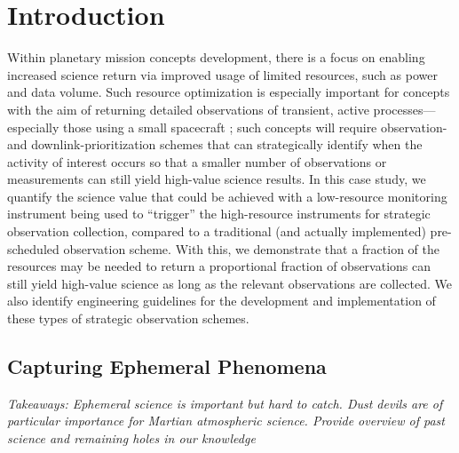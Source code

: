\section{Introduction} 
\label{sec:Introduction}

Within planetary mission concepts development, there is a focus on enabling increased science return via improved usage of limited resources, such as power and data volume.  
Such resource optimization is especially important for concepts with the aim of returning detailed observations of transient, active processes---especially those using a small spacecraft \cite{MCESAG}; such concepts will require observation- and downlink-prioritization schemes that can strategically identify when the activity of interest occurs so that a smaller number of observations or measurements can still yield high-value science results.
In this case study, we quantify the science value that could be achieved with a low-resource monitoring instrument being used to ``trigger'' the high-resource instruments for strategic observation collection, compared to a traditional (and actually implemented) pre-scheduled observation scheme. 
With this, we demonstrate that a fraction of the resources may be needed to return a proportional fraction of observations can still yield high-value science as long as the relevant observations are collected.
We also identify engineering guidelines for the development and implementation of these types of strategic observation schemes.

\subsection{Capturing Ephemeral Phenomena}
\textit{Takeaways: Ephemeral science is important but hard to catch. Dust devils are of particular importance for Martian atmospheric science. Provide overview of past science and remaining holes in our knowledge}

